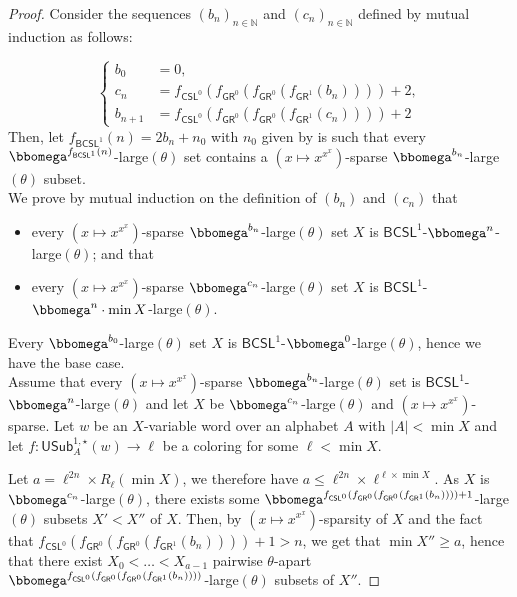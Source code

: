 \documentclass{article}
\numberwithin{theorem}{section}
\newcommand{\CSL}{\mathsf{CSL}}
\newcommand{\GR}{\mathsf{GR}}
\newcommand{\NN}{\mathbb{N}}
\newcommand{\USub}{\mathsf{USub}}
\newcommand{\BCSL}{\mathsf{BCSL}}
\begin{document}
\begin{proof}
Consider the sequences $(b_n)_{n \in \NN}$ and $(c_n)_{n \in \NN}$ defined by mutual induction as follows: 

$$
\left\{
\begin{aligned}
b_0 &= 0, \\
c_n &= f_{\CSL^0}(f_{\GR^0}(f_{\GR^0}(f_{\GR^1}(b_n)))) + 2, \\
b_{n+1} &= f_{\CSL^0}(f_{\GR^0}(f_{\GR^0}(f_{\GR^1}(c_n)))) + 2
\end{aligned}
\right.
$$
Then, let $f_{\BCSL^1}(n) = 2b_n + n_0$ with $n_0$ given by  is such that every $\bbomega^{f_{\BCSL^1}(n)}$-large$(\theta)$ set contains a $(x \mapsto x^{x^x})$-sparse $\bbomega^{b_n}$-large$(\theta)$ subset. \\   


We prove by mutual induction on the definition of $(b_n)$ and $(c_n)$ that 
\begin{itemize}
    \item[(1)] every $(x \mapsto x^{x^x})$-sparse $\bbomega^{b_n}$-large$(\theta)$ set $X$ is $\BCSL^1$-$\bbomega^n$-large$(\theta)$; and that
    \item[(2)] every $(x \mapsto x^{x^x})$-sparse $\bbomega^{c_n}$-large$(\theta)$ set $X$ is $\BCSL^1$-$\bbomega^n\cdot \min X$-large$(\theta)$.
\end{itemize}

Every $\bbomega^{b_0}$-large$(\theta)$ set $X$ is $\BCSL^1$-$\bbomega^0$-large$(\theta)$, hence we have the base case. \\

Assume that every $(x \mapsto x^{x^x})$-sparse $\bbomega^{b_n}$-large$(\theta)$ set is $\BCSL^1$-$\bbomega^n$-large$(\theta)$ and let $X$ be $\bbomega^{c_{n}}$-large$(\theta)$ and $(x \mapsto x^{x^x})$-sparse. Let $w$ be an $X$-variable word over an alphabet $A$ with $|A| < \min X$ and let $f : \USub_A^{1,\star}(w) \to \ell$ be a coloring for some $\ell < \min X$. 

Let $a = \ell^{2n} \times R_{\ell}(\min X)$, we therefore have $a \leq \ell^{2n} \times \ell^{\ell \times \min X}$. As $X$ is $\bbomega^{c_{n}}$-large$(\theta)$, there exists some $\bbomega^{f_{\CSL^0}(f_{\GR^0}(f_{\GR^0}(f_{\GR^1}(b_n)))) + 1}$-large$(\theta)$ subsets $X' < X''$ of $X$. Then, by $(x \mapsto x^{x^x})$-sparsity of $X$ and the fact that $f_{\CSL^0}(f_{\GR^0}(f_{\GR^0}(f_{\GR^1}(b_n)))) + 1 > n$, we get that $\min X'' \geq a$, hence that there exist $X_0 < \dots < X_{a - 1}$ pairwise $\theta$-apart $\bbomega^{f_{\CSL^0}(f_{\GR^0}(f_{\GR^0}(f_{\GR^1}(b_n))))}$-large$(\theta)$ subsets of $X''$. 


\end{proof}
\end{document}
